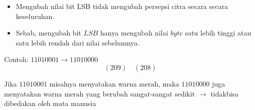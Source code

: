 \documentclass{article}
\begin{document}

\begin{itemize}
    \item Mengubah nilai bit LSB tidak mengubah persepsi citra secara secara keseluruhan.
    \item Sebab, mengubah bit $LSB$ hanya mengubah nilai $byte$ satu lebih tinggi atau satu lebih rendah dari nilai sebelumnya.
\end{itemize}

\vspace{5mm}

Contoh: $1101000\text{1} \rightarrow 1101000\text{0}$
\[ (209) \quad (208) \]

\vspace{5mm}

Jika $1101000\text{1}$ misalnya menyatakan warna $\text{merah}$, maka $1101000\text{0}$ juga menyatakan warna $\text{merah}$ yang berubah sangat-sangat sedikit $\rightarrow$ tidakbisa dibedakan oleh mata manusia
\end{document}
